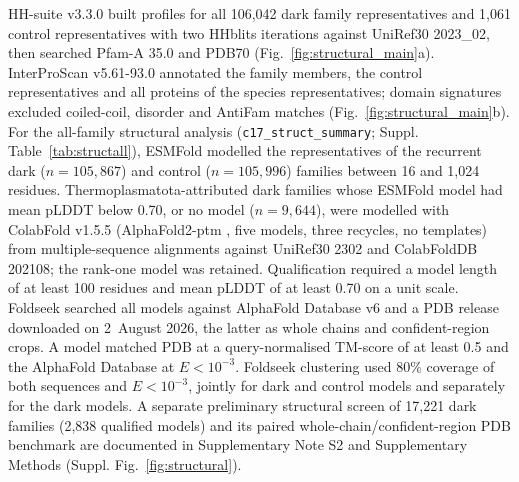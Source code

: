 \documentclass[11pt]{article}
\begin{document}
HH-suite v3.3.0 \citep{steinegger2019hhsuite} built profiles for all 106,042 dark family representatives and 1,061 control representatives with two HHblits iterations against UniRef30 2023\_02, then searched Pfam-A 35.0 and PDB70 (Fig.~\ref{fig:structural_main}a). InterProScan v5.61-93.0 \citep{jones2014interproscan} annotated the family members, the control representatives and all proteins of the species representatives; domain signatures excluded coiled-coil, disorder and AntiFam matches (Fig.~\ref{fig:structural_main}b). For the all-family structural analysis (\texttt{c17\_struct\_summary}; Suppl. Table~\ref{tab:structall}), ESMFold \citep{lin2023esmfold} modelled the representatives of the recurrent dark ($n=105,867$) and control ($n=105,996$) families between 16 and 1,024 residues. Thermoplasmatota-attributed dark families whose ESMFold model had mean pLDDT below 0.70, or no model ($n=9,644$), were modelled with ColabFold v1.5.5 \citep{mirdita2022colabfold} (AlphaFold2-ptm \citep{jumper2021alphafold}, five models, three recycles, no templates) from multiple-sequence alignments against UniRef30 2302 and ColabFoldDB 202108; the rank-one model was retained. Qualification required a model length of at least 100 residues and mean pLDDT of at least 0.70 on a unit scale. Foldseek \citep{vankempen2024foldseek} searched all models against AlphaFold Database v6 and a PDB release downloaded on 2~August 2026, the latter as whole chains and confident-region crops. A model matched PDB at a query-normalised TM-score of at least 0.5 and the AlphaFold Database at $E<10^{-3}$. Foldseek clustering used 80\% coverage of both sequences and $E<10^{-3}$, jointly for dark and control models and separately for the dark models. A separate preliminary structural screen of 17,221 dark families (2,838 qualified models) and its paired whole-chain/confident-region PDB benchmark are documented in Supplementary Note S2 and Supplementary Methods (Suppl. Fig.~\ref{fig:structural}).
\end{document}
